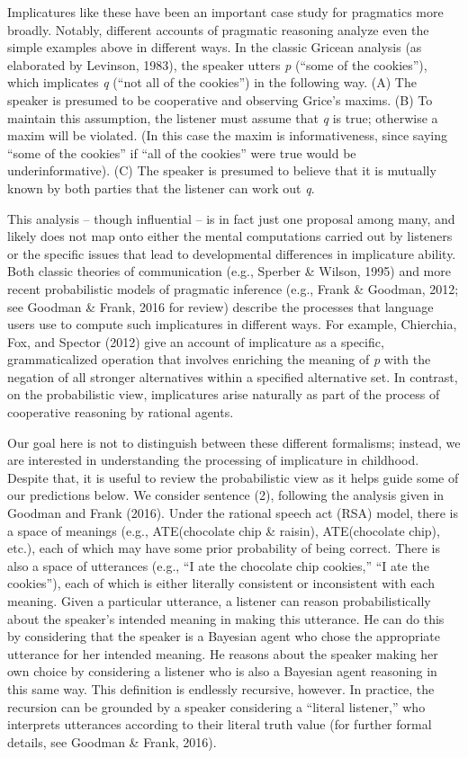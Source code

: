\documentclass[man]{apa6}
\begin{document}
Implicatures like these have been an important case study for pragmatics
more broadly. Notably, different accounts of pragmatic reasoning analyze
even the simple examples above in different ways. In the classic Gricean
analysis (as elaborated by Levinson, 1983), the speaker utters \emph{p}
(\enquote{some of the cookies}), which implicates \emph{q} (\enquote{not
all of the cookies}) in the following way. (A) The speaker is presumed
to be cooperative and observing Grice's maxims. (B) To maintain this
assumption, the listener must assume that \emph{q} is true; otherwise a
maxim will be violated. (In this case the maxim is informativeness,
since saying \enquote{some of the cookies} if \enquote{all of the
cookies} were true would be underinformative). (C) The speaker is
presumed to believe that it is mutually known by both parties that the
listener can work out \emph{q}.

This analysis -- though influential -- is in fact just one proposal
among many, and likely does not map onto either the mental computations
carried out by listeners or the specific issues that lead to
developmental differences in implicature ability. Both classic theories
of communication (e.g., Sperber \& Wilson, 1995) and more recent
probabilistic models of pragmatic inference (e.g., Frank \& Goodman,
2012; see Goodman \& Frank, 2016 for review) describe the processes that
language users use to compute such implicatures in different ways. For
example, Chierchia, Fox, and Spector (2012) give an account of
implicature as a specific, grammaticalized operation that involves
enriching the meaning of \emph{p} with the negation of all stronger
alternatives within a specified alternative set. In contrast, on the
probabilistic view, implicatures arise naturally as part of the process
of cooperative reasoning by rational agents.

Our goal here is not to distinguish between these different formalisms;
instead, we are interested in understanding the processing of
implicature in childhood. Despite that, it is useful to review the
probabilistic view as it helps guide some of our predictions below. We
consider sentence (2), following the analysis given in Goodman and Frank
(2016). Under the rational speech act (RSA) model, there is a space of
meanings (e.g., ATE(chocolate chip \& raisin), ATE(chocolate chip),
etc.), each of which may have some prior probability of being correct.
There is also a space of utterances (e.g., \enquote{I ate the chocolate
chip cookies,} \enquote{I ate the cookies}), each of which is either
literally consistent or inconsistent with each meaning. Given a
particular utterance, a listener can reason probabilistically about the
speaker's intended meaning in making this utterance. He can do this by
considering that the speaker is a Bayesian agent who chose the
appropriate utterance for her intended meaning. He reasons about the
speaker making her own choice by considering a listener who is also a
Bayesian agent reasoning in this same way. This definition is endlessly
recursive, however. In practice, the recursion can be grounded by a
speaker considering a \enquote{literal listener,} who interprets
utterances according to their literal truth value (for further formal
details, see Goodman \& Frank, 2016).
\end{document}
